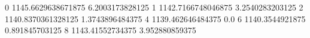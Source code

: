 0 1145.6629638671875 6.2003173828125
1 1142.7166748046875 3.2540283203125
2 1140.8370361328125 1.3743896484375
4 1139.462646484375 0.0
6 1140.3544921875 0.891845703125
8 1143.41552734375 3.952880859375
